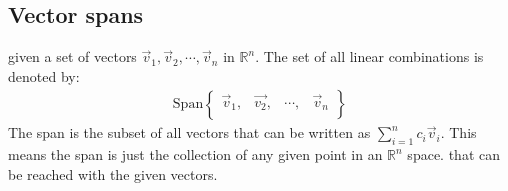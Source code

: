 \documentclass[11pt, a4paper]{article}
\begin{document}
\subsection{Vector spans}
given a set of vectors $\vec{v}_1, \vec{v}_2,\cdots, \vec{v}_n$ in $\mathbb{R}^n$.
The set of all linear combinations is denoted by:
\begin{align*}
    \text{Span} 
    \begin{Bmatrix}
        \vec{v}_1, &\vec{v_2}, & \cdots, & \vec{v}_n \\
    \end{Bmatrix}
\end{align*}
The span is the subset of all vectors that can be written as $\sum_{i=1}^{n} c_i\vec{v}_i$. This means the span
is just the collection of any given point in an  $\mathbb{R}^n$ space. that can be reached with the given vectors.
\end{document}
